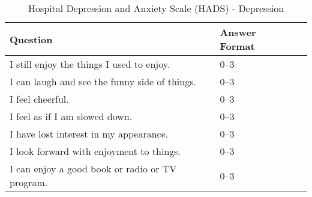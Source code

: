 \begin{table}[H]
    \centering
    \renewcommand{\arraystretch}{1.2}
    \begin{tabularx}{\textwidth}{|l|X|l|}
        \hline
        \textbf{Question} & \textbf{Answer Format} \\ \hline
        I still enjoy the things I used to enjoy. & 0--3 \\ \hline
        I can laugh and see the funny side of things. & 0--3 \\ \hline
        I feel cheerful. & 0--3 \\ \hline
        I feel as if I am slowed down. & 0--3 \\ \hline
        I have lost interest in my appearance. & 0--3 \\ \hline
        I look forward with enjoyment to things. & 0--3 \\ \hline
        I can enjoy a good book or radio or TV program. & 0--3 \\ \hline
    \end{tabularx}
    \caption{Hospital Depression and Anxiety Scale (HADS) - Depression}
    \label{tab:hads-depression}
\end{table}


